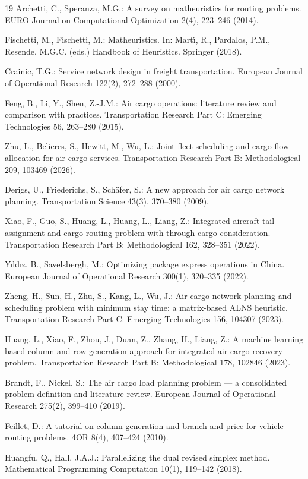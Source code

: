 \documentclass[11pt]{article}
\begin{document}
\begin{thebibliography}{19}
 Archetti, C., Speranza, M.G.: A survey on
matheuristics for routing problems. EURO Journal on Computational
Optimization 2(4), 223--246 (2014).

 Fischetti, M., Fischetti, M.: Matheuristics. In:
Mart\'{\i}, R., Pardalos, P.M., Resende, M.G.C. (eds.) Handbook of
Heuristics. Springer (2018).

 Crainic, T.G.: Service network design in freight
transportation. European Journal of Operational Research 122(2), 272--288
(2000).

 Feng, B., Li, Y., Shen, Z.-J.M.: Air cargo operations:
literature review and comparison with practices. Transportation Research
Part C: Emerging Technologies 56, 263--280 (2015).

 Zhu, L., Belieres, S., Hewitt, M., Wu, L.: Joint fleet
scheduling and cargo flow allocation for air cargo services. Transportation
Research Part B: Methodological 209, 103469 (2026).

 Derigs, U., Friederichs, S., Sch\"afer, S.: A new
approach for air cargo network planning. Transportation Science 43(3),
370--380 (2009).

 Xiao, F., Guo, S., Huang, L., Huang, L., Liang, Z.:
Integrated aircraft tail assignment and cargo routing problem with through
cargo consideration. Transportation Research Part B: Methodological 162,
328--351 (2022).

 Y{\i}ld{\i}z, B., Savelsbergh, M.: Optimizing package
express operations in China. European Journal of Operational Research 300(1),
320--335 (2022).

 Zheng, H., Sun, H., Zhu, S., Kang, L., Wu, J.: Air cargo
network planning and scheduling problem with minimum stay time: a
matrix-based ALNS heuristic. Transportation Research Part C: Emerging
Technologies 156, 104307 (2023).

 Huang, L., Xiao, F., Zhou, J., Duan, Z., Zhang, H.,
Liang, Z.: A machine learning based column-and-row generation approach for
integrated air cargo recovery problem. Transportation Research Part B:
Methodological 178, 102846 (2023).

 Brandt, F., Nickel, S.: The air cargo load planning
problem --- a consolidated problem definition and literature review.
European Journal of Operational Research 275(2), 399--410 (2019).

 Feillet, D.: A tutorial on column generation and
branch-and-price for vehicle routing problems. 4OR 8(4), 407--424 (2010).

 Huangfu, Q., Hall, J.A.J.: Parallelizing the dual
revised simplex method. Mathematical Programming Computation 10(1), 119--142
(2018).

\end{thebibliography}
\end{document}
